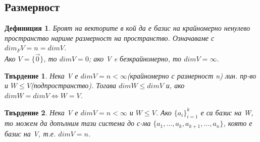 \documentclass[fleqn,12pt]{article}
\newtheorem*{Def}{Дефиниция}
\newtheorem*{Claim}{Твърдение}
\begin{document}
\begin{justify}
\subsection{Размерност}
\begin{Def}
    Броят на векторите в кой да е базис на крайномерно ненулево пространство нариме размерност на
    пространство. Означаваме с $dim_F V = n = dimV$.\\
    Ако $V=\{\vec{0}\}$, то $dimV=0$; ако V e безкрайномерно, то $dimV=\infty$.
\end{Def}

\begin{Claim}
    Нека V е $dimV = n < \infty$(крайномерно с размерност n) лин. пр-во и $W \leqslant
    V$(подпространство). Тогава $dimW \leqslant dimV$ и, ако $dimW=dimV \iff W=V$.
\end{Claim}

\begin{Claim}
    Нека V е $dimV = n < \infty$ и $W \leqslant V$. Ако $\{a_i\}_{i=1}^k$ е са базис на W, то можем
    да допълним тази система до  с-ма $\{a_1,\dots,a_k,a_{k+1},\dots,a_n\}$, която е базис на V, т.е.
    $dimV=n$.
\end{Claim}


\end{justify}
\end{document}
